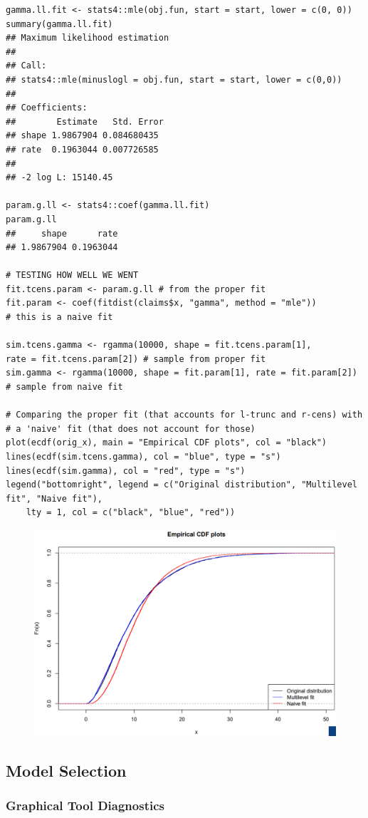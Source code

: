 \documentclass[11pt]{article}
\begin{document}
\begin{lstlisting}
gamma.ll.fit <- stats4::mle(obj.fun, start = start, lower = c(0, 0))
summary(gamma.ll.fit)
## Maximum likelihood estimation
##
## Call:
## stats4::mle(minuslogl = obj.fun, start = start, lower = c(0,0))
##
## Coefficients:
##        Estimate   Std. Error
## shape 1.9867904 0.084680435
## rate  0.1963044 0.007726585
##
## -2 log L: 15140.45

param.g.ll <- stats4::coef(gamma.ll.fit)
param.g.ll
##     shape      rate
## 1.9867904 0.1963044

# TESTING HOW WELL WE WENT
fit.tcens.param <- param.g.ll # from the proper fit
fit.param <- coef(fitdist(claims$x, "gamma", method = "mle"))
# this is a naive fit

sim.tcens.gamma <- rgamma(10000, shape = fit.tcens.param[1],
rate = fit.tcens.param[2]) # sample from proper fit
sim.gamma <- rgamma(10000, shape = fit.param[1], rate = fit.param[2])
# sample from naive fit

# Comparing the proper fit (that accounts for l-trunc and r-cens) with
# a 'naive' fit (that does not account for those)
plot(ecdf(orig_x), main = "Empirical CDF plots", col = "black")
lines(ecdf(sim.tcens.gamma), col = "blue", type = "s")
lines(ecdf(sim.gamma), col = "red", type = "s")
legend("bottomright", legend = c("Original distribution", "Multilevel fit", "Naive fit"),
    lty = 1, col = c("black", "blue", "red"))
\end{lstlisting}
\begin{figure}[H]
    \centering
    \includegraphics[width=0.7\linewidth]{l-trunc and r-cens final results plot.png}
\end{figure}

\subsection{Model Selection}
\subsubsection{Graphical Tool Diagnostics}
\end{document}

